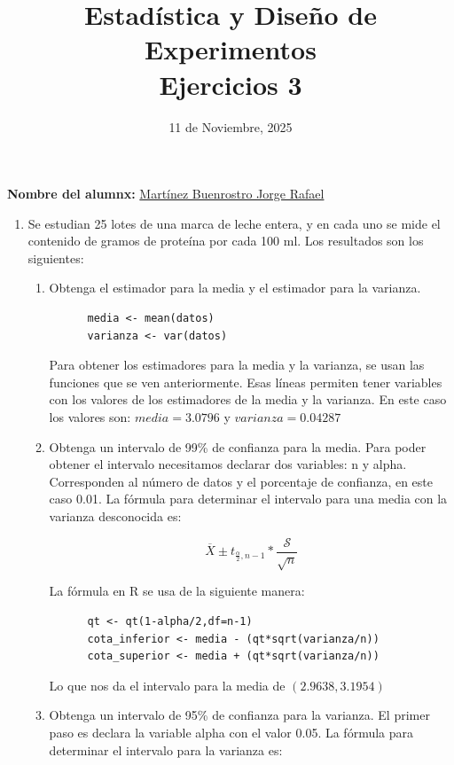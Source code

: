 \documentclass[12pt,a4paper]{article}
\title{Estadística y Diseño de Experimentos\\
Ejercicios 3}
\date{11 de Noviembre, 2025}
\author{}
\begin{document}
\maketitle

\noindent\textbf{Nombre del alumnx:} \underline{\hspace{0.5cm}Martínez Buenrostro Jorge Rafael\hspace{0.5cm}}

\vspace{1cm}

\begin{enumerate}
  \item Se estudian 25 lotes de una marca de leche entera, y en cada uno se mide el contenido de gramos de proteína por cada 100 ml. Los resultados son los siguientes:
  
  \begin{enumerate}
    \item Obtenga el estimador para la media y el estimador para la varianza.
    \begin{lstlisting}
      media <- mean(datos)
      varianza <- var(datos)
    \end{lstlisting}
    Para obtener los estimadores para la media y la varianza, se usan las funciones que se ven anteriormente. Esas líneas permiten tener variables con los valores de los estimadores de la media y la varianza. En este caso los valores son: $ media = 3.0796$ y $ varianza = 0.04287 $
    \\

    \item Obtenga un intervalo de 99\% de confianza para la media.
    Para poder obtener el intervalo necesitamos declarar dos variables: n y alpha. Corresponden al número de datos y el porcentaje de confianza, en este caso 0.01. La fórmula para determinar el intervalo para una media con la varianza desconocida es:
    
    \[ \overline{X} \pm t_{\frac{\alpha}{2},n-1} * \frac{\mathcal{S}}{\sqrt{n}}  \]
    
    La fórmula en R se usa de la siguiente manera:

    \begin{lstlisting}
      qt <- qt(1-alpha/2,df=n-1)
      cota_inferior <- media - (qt*sqrt(varianza/n))
      cota_superior <- media + (qt*sqrt(varianza/n))
    \end{lstlisting}

    Lo que nos da el intervalo para la media de  \( (2.9638 , 3.1954) \)
    \\
    \item Obtenga un intervalo de 95\% de confianza para la varianza.
    El primer paso es declara la variable alpha con el valor 0.05. La fórmula para determinar el intervalo para la varianza es:
    

\end{enumerate}
\end{enumerate}
\end{document}
